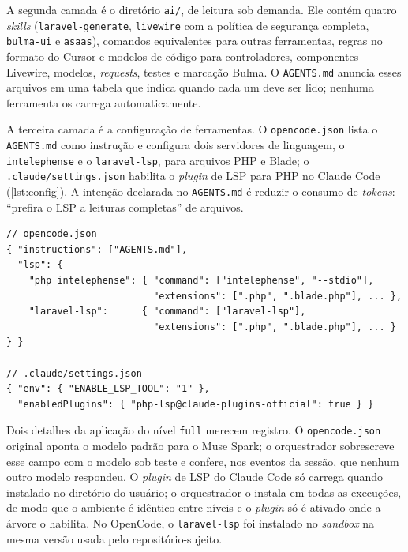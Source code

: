 A segunda camada é o diretório \texttt{ai/}, de leitura sob demanda. Ele
contém quatro \textit{skills} (\texttt{laravel-generate}, \texttt{livewire} com
a política de segurança completa, \texttt{bulma-ui} e \texttt{asaas}), comandos
equivalentes para outras ferramentas, regras no formato do Cursor e modelos de
código para controladores, componentes Livewire, modelos, \textit{requests},
testes e marcação Bulma. O \texttt{AGENTS.md} anuncia esses arquivos em uma
tabela que indica quando cada um deve ser lido; nenhuma ferramenta os carrega
automaticamente.

A terceira camada é a configuração de ferramentas. O \texttt{opencode.json}
lista o \texttt{AGENTS.md} como instrução e configura dois servidores de
linguagem, o \texttt{intelephense} e o \texttt{laravel-lsp}, para arquivos PHP
e Blade; o \texttt{.claude/settings.json} habilita o \textit{plugin} de LSP
para PHP no Claude Code (\autoref{lst:config}). A intenção declarada no
\texttt{AGENTS.md} é reduzir o consumo de \textit{tokens}: ``prefira o LSP a
leituras completas'' de arquivos.

\begin{lstlisting}[float=htb, caption={Configuração de ferramentas do nível \texttt{full}: \texttt{opencode.json} (abreviado) e \texttt{.claude/settings.json}}, label={lst:config}, basicstyle=\ttfamily\footnotesize, numbers=none]
// opencode.json
{ "instructions": ["AGENTS.md"],
  "lsp": {
    "php intelephense": { "command": ["intelephense", "--stdio"],
                          "extensions": [".php", ".blade.php"], ... },
    "laravel-lsp":      { "command": ["laravel-lsp"],
                          "extensions": [".php", ".blade.php"], ... } } }

// .claude/settings.json
{ "env": { "ENABLE_LSP_TOOL": "1" },
  "enabledPlugins": { "php-lsp@claude-plugins-official": true } }
\end{lstlisting}

Dois detalhes da aplicação do nível \texttt{full} merecem registro. O
\texttt{opencode.json} original aponta o modelo padrão para o Muse Spark; o
orquestrador sobrescreve esse campo com o modelo sob teste e confere, nos
eventos da sessão, que nenhum outro modelo respondeu. O \textit{plugin} de LSP
do Claude Code só carrega quando instalado no diretório do usuário; o
orquestrador o instala em todas as execuções, de modo que o ambiente é
idêntico entre níveis e o \textit{plugin} só é ativado onde a árvore o habilita.
No OpenCode, o \texttt{laravel-lsp} foi instalado no \textit{sandbox} na mesma
versão usada pelo repositório-sujeito.

